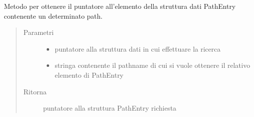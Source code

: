 \documentclass[letterpaper,10pt,italian,openany,oneside]{sphinxmanual}
\begin{document}

\begin{fulllineitems}
\label{\detokenize{code/datastructure:c.getPathEntry}}
Metodo per ottenere il puntatore all’elemento della struttura dati PathEntry contenente un determinato path.
\begin{quote}\begin{description}
\item[{Parametri}] \leavevmode\begin{itemize}
\item {} 
 \textendash{} puntatore alla struttura dati in cui effettuare la ricerca

\item {} 
 \textendash{} stringa contenente il pathname di cui si vuole ottenere il relativo elemento di PathEntry

\end{itemize}

\item[{Ritorna}] \leavevmode
puntatore alla struttura PathEntry richiesta

\end{description}\end{quote}

\end{fulllineitems}




\renewcommand{\indexname}{Indice}
\printindex
\end{document}
